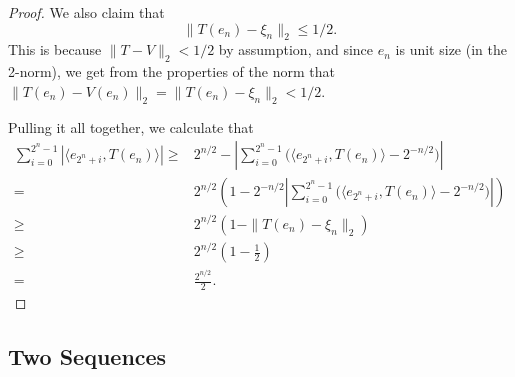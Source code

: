 \documentclass{dcthesis}
\numberwithin{equation}{section}
\numberwithin{equation}{section}
\theoremstyle{definition}
\begin{document}
\begin{proof}
	We also claim that 
	\begin{equation*}
		\|T(e_n)-\xi_n\|_2\leq 1/2.
	\end{equation*}
	This is because $\|T-V\|_2<1/2$ by assumption, and since $e_n$ is unit size (in the 2-norm), we get from the properties of the norm that $\|T(e_n) - V(e_n)\|_2=\|T(e_n)-\xi_n\|_2<1/2$. 

	Pulling it all together, we calculate that 
	\begin{align*}
		\sum_{i=0}^{2^n-1}|\langle e_{2^n+i}, T(e_n)\rangle|
		\geq& 2^{n/2} - \left| \sum_{i=0}^{2^n-1} \big( \langle e_{2^n+i},T(e_n)\rangle - 2^{-n/2} \big) \right| \\
		=& 2^{n/2}\left( 1 - 2^{-n/2} \left| \sum_{i=0}^{2^n-1} \big( \langle e_{2^n+i},T(e_n)\rangle - 2^{-n/2} \big) \right| \right) \\
		\geq& 2^{n/2}(1-\|T(e_n)-\xi_n\|_2) \\
		\geq& 2^{n/2}\left(1-\frac{1}{2}\right) \\
		=& \frac{2^{n/2}}{2}.
	\end{align*}
\end{proof}



\subsection{Two Sequences} %
\end{document}
